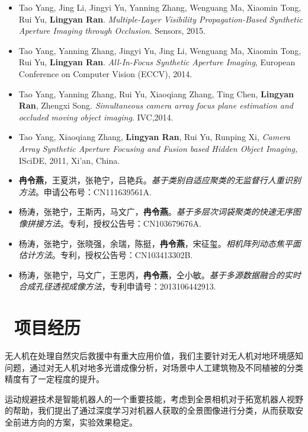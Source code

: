 \documentclass{resume}
\begin{document}
\begin{itemize}
  \item Tao Yang, Jing Li, Jingyi Yu, Yanning Zhang, Wenguang Ma, Xiaomin Tong, Rui Yu, \textbf{Lingyan Ran}. \textit{Multiple-Layer Visibility Propagation-Based Synthetic Aperture Imaging through Occlusion}. Sensors, 2015. %
  \item Tao Yang, Yanning Zhang, Jingyi Yu, Jing Li, Wenguang Ma, Xiaomin Tong, Rui Yu, \textbf{Lingyan Ran}. \textit{All-In-Focus Synthetic Aperture Imaging}, European Conference on Computer Vision (ECCV), 2014.
  \item Tao Yang, Yanning Zhang, Rui Yu, Xiaoqiang Zhang, Ting Chen, \textbf{Lingyan Ran}, Zhengxi Song. \textit{Simultaneous camera array focus plane estimation and occluded moving object imaging}. IVC,2014.
  \item Tao Yang, Xiaoqiang Zhang, \textbf{Lingyan Ran}, Rui Yu, Runping Xi, \textit{Camera Array Synthetic Aperture Focusing and Fusion based Hidden Object Imaging,} ISciDE, 2011, Xi'an, China.
  \newline
  \item \textbf{冉令燕}，王夏洪，张艳宁，吕艳兵。\textit{基于类别自适应聚类的无监督行人重识别方法}。申请公布号：CN111639561A.
  \item 杨涛，张艳宁，王斯丙，马文广，\textbf{冉令燕}。\textit{基于多层次词袋聚类的快速无序图像拼接方法}。专利，授权公告号：CN103679676A.
  \item 杨涛，张艳宁，张晓强，余瑞，陈挺，\textbf{冉令燕}，宋征玺。\textit{相机阵列动态焦平面估计方法}。专利，授权公告号：CN103413302B.
  \item 杨涛，张艳宁，马文广，王思丙，\textbf{冉令燕}，仝小敏。\textit{基于多源数据融合的实时合成孔径透视成像方法}，专利申请号：2013106442913.
\end{itemize}

\section{\faUsers\ 项目经历}
无人机在处理自然灾后救援中有重大应用价值，我们主要针对无人机对地环境感知问题，通过对无人机对地多光谱成像分析，对场景中人工建筑物及不同植被的分类精度有了一定程度的提升。

运动规避技术是智能机器人的一个重要技能，考虑到全景相机对于拓宽机器人视野的帮助，我们提出了通过深度学习对机器人获取的全景图像进行分类，从而获取安全前进方向的方案，实验效果稳定。
\end{document}
